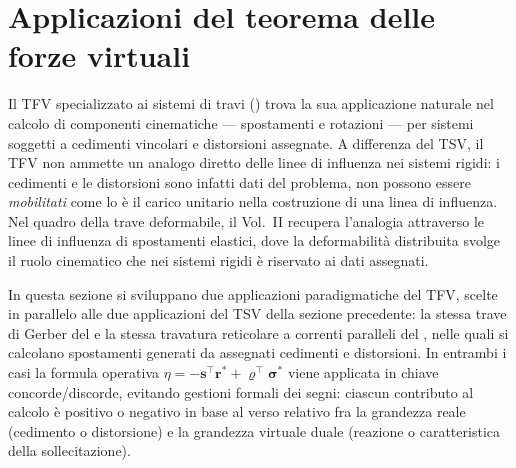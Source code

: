 \section{Applicazioni del teorema delle forze virtuali}
\label{sec:applicazioni_TFV}

Il TFV specializzato ai sistemi di travi
() trova la sua applicazione
naturale nel calcolo di componenti cinematiche ---
spostamenti e rotazioni --- per sistemi soggetti a
cedimenti vincolari e distorsioni assegnate. A
differenza del TSV, il TFV non ammette un analogo
diretto delle linee di influenza nei sistemi rigidi: i
cedimenti e le distorsioni sono infatti dati del
problema, non possono essere \emph{mobilitati} come lo
è il carico unitario nella costruzione di una linea di
influenza. Nel quadro della trave deformabile, il
Vol.~II recupera l'analogia attraverso le linee di
influenza di spostamenti elastici, dove la deformabilità
distribuita svolge il ruolo cinematico che nei sistemi
rigidi è riservato ai dati assegnati.

In questa sezione si sviluppano due applicazioni
paradigmatiche del TFV, scelte in parallelo alle due
applicazioni del TSV della sezione precedente:
la stessa trave di Gerber del 
 e la stessa travatura 
reticolare a correnti paralleli del 
, nelle quali si 
calcolano spostamenti generati da assegnati cedimenti 
e distorsioni. In entrambi i casi la formula operativa
$\eta = -\bm{s}^\top \bm{r}^* + \bm{\varrho}^\top
\bm{\sigma}^*$ viene applicata in chiave concorde/discorde,
evitando gestioni formali dei segni: ciascun contributo
al calcolo è positivo o negativo in base al verso
relativo fra la grandezza reale (cedimento o distorsione)
e la grandezza virtuale duale (reazione o caratteristica
della sollecitazione).



